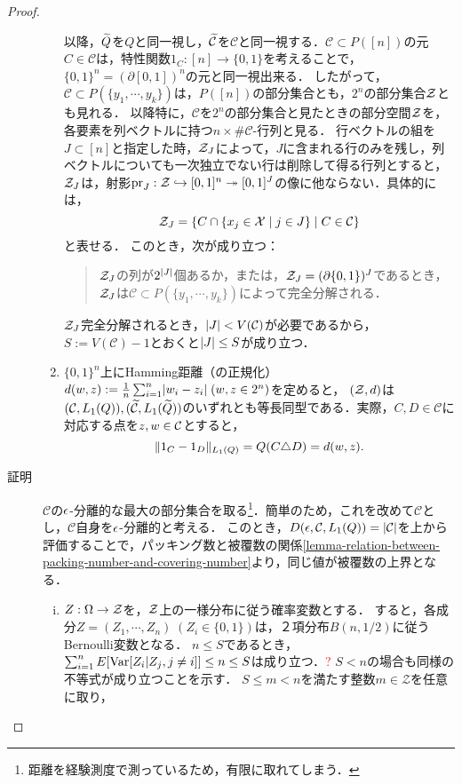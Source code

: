 \documentclass[uplatex,dvipdfmx]{jsreport}
\renewcommand{\C}{\mathcal{C}}
\renewcommand{\Z}{\mathcal{Z}}
\begin{document}
\begin{proof}
\begin{description}
\begin{enumerate}
            以降，$\widetilde{Q}$を$Q$と同一視し，$\wt{\C}$を$\C$と同一視する．$\C\subset P([n])$の元$C\in\C$は，特性関数$1_C:[n]\to\{0,1\}$を考えることで，$\{0,1\}^n=(\partial[0,1])^n$の元と同一視出来る．
            したがって，$\C\subset P(\{y_1,\cdots,y_k\})$は，$P([n])$の部分集合とも，$2^n$の部分集合$\mathcal{Z}$とも見れる．
            以降特に，$\C$を$2^n$の部分集合と見たときの部分空間$\mathcal{Z}$を，各要素を列ベクトルに持つ$n\times\#\C$-行列と見る．
            行ベクトルの組を$J\subset[n]$と指定した時，$\mathcal{Z}_J$によって，$J$に含まれる行のみを残し，列ベクトルについても一次独立でない行は削除して得る行列とすると，
            $\mathcal{Z}_J$は，射影$\mathrm{pr}_J:\mathcal{Z}\hookrightarrow[0,1]^n\twoheadrightarrow[0,1]^J$の像に他ならない．具体的には，
            \[\cZ_J=\Brace{C\cap\{x_j\in\X\mid j\in J\}\mid C\in\C}\]
            と表せる．
            このとき，次が成り立つ：
            \begin{quote}
                $\mathcal{Z}_J$の列が$2^{\lvert J\rvert}$個あるか，または，$\mathcal{Z}_J=(\partial\{0,1\})^J$であるとき，$\mathcal{Z}_J$は$\C\subset P(\{y_1,\cdots,y_k\})$によって完全分解される．
            \end{quote}
            $\mathcal{Z}_J$完全分解されるとき，$\abs{J}<V(\C)$が必要であるから，$S:=V(\C)-1$とおくと$\lvert J\rvert\le S$が成り立つ．
            \item $\{0,1\}^n$上にHamming距離（の正規化）$d(w,z):=\frac{1}{n}\sum^n_{i=1}\lvert w_i-z_i\rvert\;(w,z\in 2^n)$を定めると，
            $(\mathcal{Z},d)$は$(\C,L_1(Q)),(\wt{\C},L_1(\wt{Q}))$のいずれとも等長同型である．実際，$C,D\in\C$に対応する点を$z,w\in\mathcal{C}$とすると，
            \[\|1_C-1_D\|_{L_1(Q)}=Q(C\triangle D)=d(w,z).\]
        \end{enumerate}
        \item[証明] $\C$の$\epsilon$-分離的な最大の部分集合を取る\footnote{距離を経験測度で測っているため，有限に取れてしまう．}．簡単のため，これを改めて$\C$とし，$\C$自身を$\epsilon$-分離的と考える．
        このとき，$D(\ep,\C,L_1(Q))=\abs{\C}$を上から評価することで，パッキング数と被覆数の関係\ref{lemma-relation-between-packing-number-and-covering-number}より，同じ値が被覆数の上界となる．
        \begin{enumerate}[(i)]
            \item $Z:\Omega\to\mathcal{Z}$を，$\mathcal{Z}$上の一様分布に従う確率変数とする．
            すると，各成分$Z=(Z_1,\cdots,Z_n)\;(Z_i\in\{0,1\})$は，２項分布$B(n,1/2)$に従うBernoulli変数となる．
            $n\le S$であるとき，$\sum^n_{i=1}E[\mathrm{Var}[Z_i|Z_j,j\ne i]]\le n\le S$は成り立つ．\textcolor{red}{?}
            $S<n$の場合も同様の不等式が成り立つことを示す．
            $S\le m<n$を満たす整数$m\in\Z$を任意に取り，

\end{enumerate}
\end{description}
\end{proof}
\end{document}
